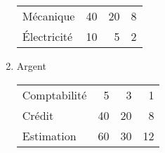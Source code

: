 \documentclass[11pt]{article}
\begin{document}
\begin{twocols}
\begin{enumerate}
\begin{center}
\begin{tabular}{lrrr}
Mécanique & 40 & 20 & 8\\
Électricité & 10 & 5 & 2\\
\end{tabular}
\end{center}

\item Argent
\label{sec:org4a7bf36}

\begin{center}
\begin{tabular}{lrrr}
Comptabilité & 5 & 3 & 1\\
Crédit & 40 & 20 & 8\\
Estimation & 60 & 30 & 12\\
\end{tabular}
\end{center}
\end{enumerate}

\end{twocols}
\pagebreak
\end{document}
